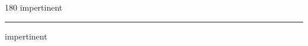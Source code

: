 
\begin{frame}
\begin{center}
\begin{turn}{180}
{\fontsize{2.5cm}{1em}\selectfont impertinent}
\end{turn}
\vspace{1em}\par  
\hrule
\vspace{1em}\par  
{\fontsize{2.5cm}{1em}\selectfont impertinent}
\end{center}
\end{frame}
